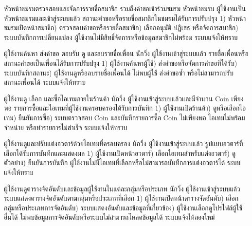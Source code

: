 {หัวหน้าชมรมตรวจสอบและจัดการรายชื่อสมาชิก รวมถึงคำขอเข้าร่วมชมรม}
{หัวหน้าชมรม}
{ผู้ใช้งานเป็นหัวหน้าชมรมและเข้าสู่ระบบแล้ว}
{สถานะคำขอหรือรายชื่อสมาชิกในชมรมได้รับการปรับปรุง}
{1) หัวหน้าชมรมเปิดหน้าสมาชิก) ตรวจสอบคำขอหรือรายชื่อสมาชิก) เลือกอนุมัติ ปฏิเสธ หรือจัดการสมาชิก) ระบบบันทึกการเปลี่ยนแปลง}
{ผู้ใช้งานไม่มีสิทธิ์จัดการหรือข้อมูลสมาชิกไม่พร้อม ระบบแจ้งให้ทราบ}

{ผู้ใช้งานค้นหา ส่งคำขอ ตอบรับ ดู และลบรายชื่อเพื่อน}
{นักวิ่ง}
{ผู้ใช้งานเข้าสู่ระบบแล้ว}
{รายชื่อเพื่อนหรือสถานะคำขอเป็นเพื่อนได้รับการปรับปรุง}
{1) ผู้ใช้งานค้นหาผู้ใช้) ส่งคำขอหรือจัดการคำขอที่ได้รับ) ระบบบันทึกสถานะ) ผู้ใช้งานดูหรือลบรายชื่อเพื่อนได้}
{ไม่พบผู้ใช้ ส่งคำขอซ้ำ หรือไม่สามารถปรับสถานะเพื่อนได้ ระบบแจ้งให้ทราบ}

{ผู้ใช้งานดู เลือก และซื้อไอเทมภายในร้านค้า}
{นักวิ่ง}
{ผู้ใช้งานเข้าสู่ระบบแล้วและมีจำนวน Coin เพียงพอ}
{รายการซื้อและไอเทมที่ผู้ใช้งานครอบครองได้รับการบันทึก}
{1) ผู้ใช้งานเปิดร้านค้า) ดูหรือเลือกไอเทม) ยืนยันการซื้อ) ระบบตรวจสอบ Coin และบันทึกรายการซื้อ}
{Coin ไม่เพียงพอ ไอเทมไม่พร้อมจำหน่าย หรือทำรายการไม่สำเร็จ ระบบแจ้งให้ทราบ}

{ผู้ใช้งานดูและปรับแต่งอวตาร์ด้วยไอเทมที่ครอบครอง}
{นักวิ่ง}
{ผู้ใช้งานเข้าสู่ระบบแล้ว}
{รูปแบบอวตาร์ที่เลือกได้รับการบันทึกและแสดงผล}
{1) ผู้ใช้งานเปิดหน้าอวตาร์) เลือกไอเทมสำหรับแต่งอวตาร์) ดูตัวอย่าง) ยืนยันการบันทึก}
{ผู้ใช้งานไม่มีไอเทมที่เลือกหรือไม่สามารถบันทึกการแต่งอวตาร์ได้ ระบบแจ้งให้ทราบ}

{ผู้ใช้งานดูตารางจัดอันดับและข้อมูลผู้ใช้งานในแต่ละกลุ่มหรือประเภท}
{นักวิ่ง}
{ผู้ใช้งานเข้าสู่ระบบแล้ว}
{ระบบแสดงตารางจัดอันดับตามกลุ่มหรือประเภทที่เลือก}
{1) ผู้ใช้งานเปิดหน้าตารางจัดอันดับ) เลือกกลุ่มหรือประเภทการจัดอันดับ) ระบบแสดงอันดับและข้อมูลที่เกี่ยวข้อง) ผู้ใช้งานเลือกดูโปรไฟล์ผู้ใช้อื่นได้}
{ไม่พบข้อมูลการจัดอันดับหรือระบบไม่สามารถโหลดข้อมูลได้ ระบบแจ้งให้ลองใหม่}
